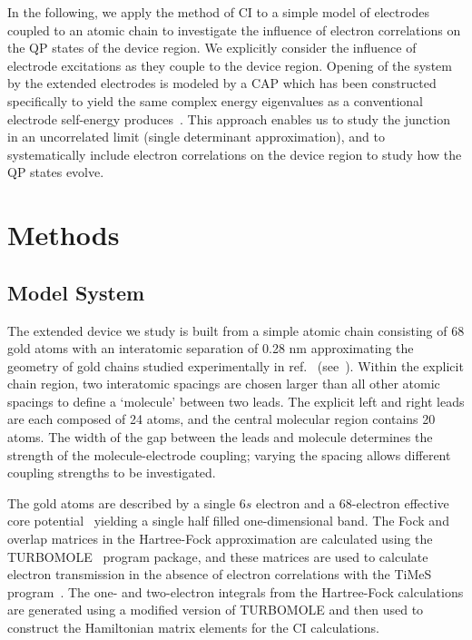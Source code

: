 In the following, we apply the method of \ac{CI} to a simple model of
electrodes coupled to an atomic chain to investigate the influence of
electron correlations on the \ac{QP} states of the device
region. We explicitly consider the influence of electrode excitations as
they couple to the device region. Opening of the system by the extended
electrodes is modeled by a \ac{CAP} which has been constructed specifically
to yield the same complex energy eigenvalues as a conventional electrode
self-energy produces~\cite{henderson}. This approach enables us to study
the junction in an uncorrelated limit (single determinant approximation), and
to systematically include electron correlations on the device region
to study how the \ac{QP} states evolve. 

\section{Methods}
\label{sec:method}

\subsection{Model System}
\label{subsec:modelsystem}

The extended device we study is built from a simple atomic chain
consisting of 68 gold atoms with an interatomic separation of 0.28 nm
approximating the geometry of gold chains studied experimentally in
ref.~\cite{nilius2002science} (see~).
Within the explicit chain region, two interatomic spacings are chosen
larger than all other atomic spacings to define a `molecule' between two
leads. The explicit left and right leads are each composed of 24 atoms,
and the central molecular region contains 20 atoms. The width of the gap
between the leads and molecule determines the strength of the
molecule-electrode coupling; varying the spacing allows different
coupling strengths to be investigated. 

The gold atoms are described by a single 6$s$ electron and a 68-electron
effective core potential~\cite{CRENBS} yielding a single half filled
one-dimensional band. The Fock and overlap matrices in the Hartree-Fock
approximation are calculated  using the TURBOMOLE~\cite{turbomole} program
package, and these matrices are used to calculate electron transmission
in the absence of electron correlations with the TiMeS  program~\cite{times}.
The one- and two-electron integrals from the Hartree-Fock calculations
are generated using a modified version of TURBOMOLE and then used to
construct the Hamiltonian matrix elements for the CI calculations.

